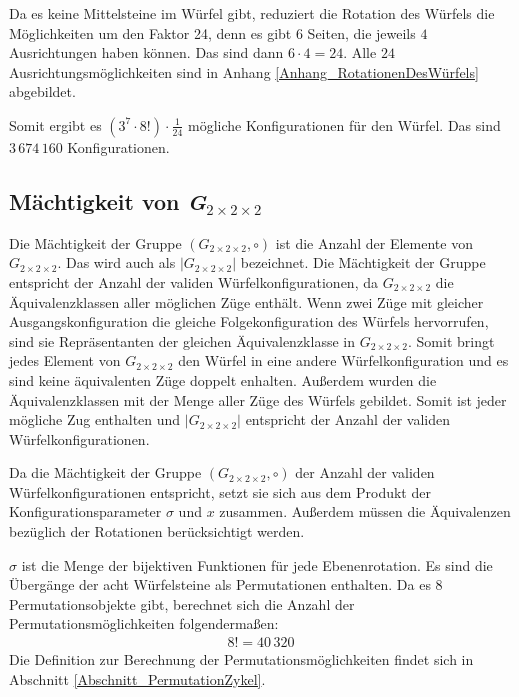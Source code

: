 \documentclass[12pt,a4paper, usenames, dvipsnames]{article}
\theoremstyle{mystyle}
\theoremstyle{definition}
\newcommand{\Gtwo}{\ensuremath{G_{2\times 2\times 2}}}
\begin{document}
Da es keine Mittelsteine im Würfel gibt, reduziert die Rotation des Würfels die Möglichkeiten um den Faktor 24, denn es gibt $6$ Seiten, die jeweils $4$ Ausrichtungen haben können. Das sind dann $6 \cdot 4 = 24$. Alle $24$ Ausrichtungsmöglichkeiten sind in Anhang \ref{Anhang_RotationenDesWürfels} abgebildet.

Somit ergibt es $(3^7 \cdot 8!) \cdot \frac{1}{24}$ mögliche Konfigurationen für den Würfel. Das sind $3\, 674\, 160$ Konfigurationen.



%
%
%
%
%
%
%
%
%
%
%
%
%
%
%
%
%
%
%

\subsection{Mächtigkeit von \textit{G}$_{2 \times  2 \times 2}$} %

\label{Abschnitt_MächtigkeitVonG}

Die Mächtigkeit der Gruppe $(\Gtwo,\circ)$ ist die Anzahl der Elemente von $\Gtwo$. Das wird auch als $|\Gtwo|$ bezeichnet. Die Mächtigkeit der Gruppe entspricht der Anzahl der validen Würfelkonfigurationen, da $\Gtwo$ die Äquivalenzklassen aller möglichen Züge enthält. Wenn zwei Züge mit gleicher Ausgangskonfiguration die gleiche Folgekonfiguration des Würfels hervorrufen, sind sie Repräsentanten der gleichen Äquivalenzklasse in $\Gtwo$. Somit bringt jedes Element von $\Gtwo$ den Würfel in eine andere Würfelkonfiguration und es sind keine äquivalenten Züge doppelt enhalten. Außerdem wurden die Äquivalenzklassen mit der Menge aller Züge des Würfels gebildet. Somit ist jeder mögliche Zug enthalten und $|\Gtwo|$ entspricht der Anzahl der validen Würfelkonfigurationen.

Da die Mächtigkeit der Gruppe $(\Gtwo,\circ)$ der Anzahl der validen Würfelkonfigurationen entspricht, setzt sie sich aus dem Produkt der Konfigurationsparameter $\sigma$ und $x$ zusammen. Außerdem müssen die Äquivalenzen bezüglich der Rotationen berücksichtigt werden.

$\sigma$ ist die Menge der bijektiven Funktionen für jede Ebenenrotation. Es sind die Übergänge der acht Würfelsteine als Permutationen enthalten. Da es $8$ Permutationsobjekte gibt, berechnet sich die Anzahl der Permutationsmöglichkeiten folgendermaßen:
\begin{align*}
8! = 40 \, 320
\end{align*}
Die Definition zur Berechnung der Permutationsmöglichkeiten findet sich in Abschnitt \ref{Abschnitt_PermutationZykel}.
\end{document}
